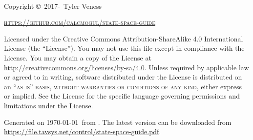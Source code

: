 ~\vfill
\thispagestyle{empty}

Copyright \copyright\ 2017-\the\year~Tyler Veness

\textsc{\url{https://github.com/calcmogul/state-space-guide}}

Licensed under the Creative Commons Attribution-ShareAlike 4.0 International
License (the ``License''). You may not use this file except in compliance with
the License. You may obtain a copy of the License at
\url{http://creativecommons.org/licenses/by-sa/4.0}. Unless required by
applicable law or agreed to in writing, software distributed under the License
is distributed on an \textsc{``as is'' basis, without warranties or conditions
of any kind}, either express or implied. See the License for the specific
language governing permissions and limitations under the License.

Generated on \monthdayyeardate\today~from \unskip.
The latest version can be downloaded from
\url{https://file.tavsys.net/control/state-space-guide.pdf}.
